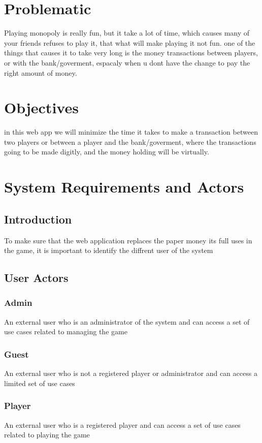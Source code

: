 \documentclass{article}
\begin{document}
\section{Problematic}\label{sec:prbm}
Playing monopoly is really fun, but it take a lot of time, which causes many of your friends refuses to play it, that what will make playing it not fun.
one of the things that causes it to take very long is the money transactions between players, or with the bank/goverment, espacaly when u dont have the change to pay the right amount of money.

\section{Objectives}\label{sec:obj}
in this web app we will minimize the time it takes to make a transaction between two players or between a player and the bank/goverment, where the transactions going to be made digitly, and the money holding will be virtually.

\section {System Requirements and Actors}
\subsection {Introduction}
To make sure that the web application replaces the paper money its full uses in the game, it is important to identify the diffrent user of the system

\subsection {User Actors}
	\subsubsection {Admin}
 An external user who is an administrator of the system and can access a set of use cases related to managing the game
	\subsubsection {Guest}
An external user who is not a registered player or administrator and can access a limited set of use cases
	\subsubsection {Player}
 An external user who is a registered player and can access a set of use cases related to playing the game
\end{document}
